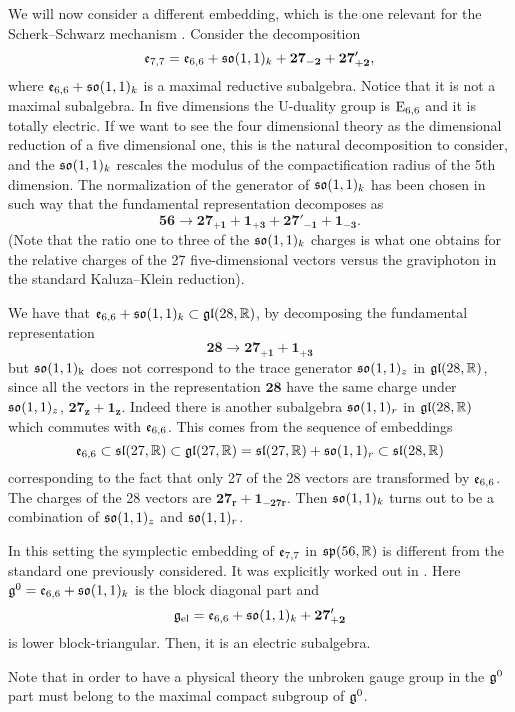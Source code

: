 \documentclass[a4paper,12pt]{article}
\begin{document}
\bigskip

 We will now consider a different embedding, which is
the one relevant for the Scherk--Schwarz mechanism \cite{adfl2}.  Consider the
decomposition $$\mathfrak{e}_{7,7}=\mathfrak{e}_{6,6}+\mathfrak{so}(1,1)_{k} +
\mathbf{27_{-2}}+\mathbf{27'_{+2}},$$ where
$\mathfrak{e}_{6,6}+\mathfrak{so}(1,1)_{k}$ is a maximal reductive
subalgebra. Notice that it is not a
maximal subalgebra.  In five dimensions the U-duality group is
$\mathrm{E}_{6,6}$ and it is totally electric. If we want to see the four
dimensional theory as the dimensional reduction of a five
dimensional one, this is the natural decomposition to consider,
and the $\mathfrak{so}(1,1)_{k}$ rescales the modulus of the
compactification radius of the 5th dimension. The normalization of
the generator of $\mathfrak{so}(1,1)_{k}$ has been chosen in such way that
the fundamental representation decomposes as
$$\mathbf{56}\rightarrow \mathbf{27_{+1}}
+\mathbf{1_{+3}}+\mathbf{27'_{-1}}+\mathbf{1_{-3}}. $$ (Note that
the ratio one to three of the $\mathfrak{so}(1,1)_{k}$ charges is what one
obtains for the relative charges of the 27 five-dimensional
vectors versus the graviphoton in the standard Kaluza--Klein
reduction).




 We have that $\mathfrak{e}_{6,6}+\mathfrak{so}(1,1)_{k}
\subset\mathfrak{gl}(28,\mathbb{R})$, by decomposing the fundamental representation
$$\mathbf{28}\rightarrow \mathbf{27_{+1}}+\mathbf{1_{+3}}$$ but
$\mathfrak{so}(1,1)_{\mathrm{k}}$ does not correspond to the trace
generator $\mathfrak{so}(1,1)_z$ in $\mathfrak{gl}(28,\mathbb{R})$, since all the  vectors
in the representation $\mathbf{28}$  have  the same charge under
$\mathfrak{so}(1,1)_z$, $\mathbf{27_z}+\mathbf{1_z}$. Indeed there is
another subalgebra $\mathfrak{so}(1,1)_r$ in $\mathfrak{gl}(28,\mathbb{R})$ which commutes
with $\mathfrak{e}_{6,6}$. This comes from the sequence of embeddings
$$\mathfrak{e}_{6,6}\subset\mathfrak{sl}(27,\mathbb{R})\subset
\mathfrak{gl}(27,\mathbb{R})=\mathfrak{sl}(27,\mathbb{R})+\mathfrak{so}(1,1)_r\subset \mathfrak{sl}(28,\mathbb{R})$$
corresponding to the fact that only 27 of the 28 vectors are
transformed by $\mathfrak{e}_{6,6}$. The charges of the 28 vectors are
$\mathbf{27_r}+\mathbf{1_{-27r}}$. Then $\mathfrak{so}(1,1)_{k}$ turns out
to be a combination of $\mathfrak{so}(1,1)_z$ and $\mathfrak{so}(1,1)_r$.

In this setting the symplectic embedding of $\mathfrak{e}_{7,7}$ in
$\mathfrak{sp}(56,\mathbb{R})$ is different from the standard one previously
considered. It was explicitly worked out in \cite{adfl2}. Here
$\mathfrak{g}^0 = \mathfrak{e}_{6,6}+\mathfrak{so}(1,1)_{k}$ is the block diagonal part and
$$\mathfrak{g}_{\mathrm{el}} = \mathfrak{e}_{6,6}+\mathfrak{so}(1,1)_{k} +\mathbf{27'_{+2}}$$
is lower block-triangular. Then, it is an electric subalgebra.
\par
Note that in order to have a physical theory the unbroken gauge
group in the $\mathfrak{g}^0$ part must belong to the maximal compact
subgroup of $\mathfrak{g}^0$.
\end{document}
